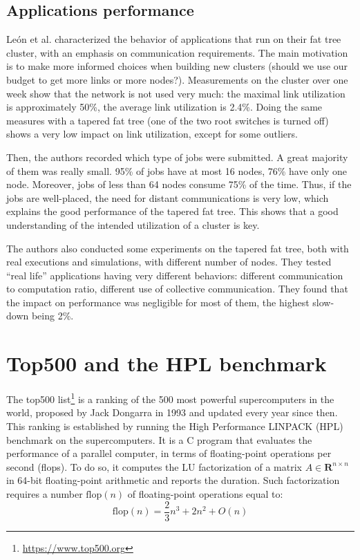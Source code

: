 \documentclass[12pt, a4paper]{memoir}
\begin{document}
\subsection{Applications performance}
\label{sec:orgfb9773e}
León et al.\cite{Leon:2016:CPS:3014904.3015009} characterized the behavior of applications that run on
their fat tree cluster, with an emphasis on communication requirements. The main motivation is to make more informed
choices when building new clusters (should we use our budget to get more links or more nodes?).  Measurements on the
cluster over one week show that the network is not used very much: the maximal link utilization is approximately
50\%, the average link utilization is 2.4\%. Doing the same measures with a tapered fat tree (one of the two root
switches is turned off) shows a very low impact on link utilization, except for some outliers.

Then, the authors recorded which type of jobs were submitted. A great majority of them was really small.  95\% of
jobs have at most 16 nodes, 76\% have only one node. Moreover, jobs of less than 64 nodes consume 75\% of the time.
Thus, if the jobs are well-placed, the need for distant communications is very low, which explains the good
performance of the tapered fat tree. This shows that a good understanding of the intended utilization of a cluster
is key.

The authors also conducted some experiments on the tapered fat tree, both with real executions and simulations, with
different number of nodes. They tested “real life” applications having very different behaviors: different
communication to computation ratio, different use of collective communication. They found that the impact on
performance was negligible for most of them, the highest slow-down being 2\%.

\section{Top500 and the HPL benchmark}
\label{sec:orgb455b0c}
The top500 list\footnote{\url{https://www.top500.org}} is a ranking of the 500 most powerful supercomputers in the world, proposed by Jack
Dongarra in 1993 and updated every year since then.  This ranking is established by running the High Performance
LINPACK (HPL) benchmark\cite{Dongarra03thelinpack} on the supercomputers. It is a C program that evaluates the
performance of a parallel computer, in terms of floating-point operations per second (flops). To do so, it computes
the LU factorization of a matrix \(A \in \mathbf{R}^{n \times n}\) in 64-bit floating-point arithmetic and reports the
duration. Such factorization requires a number \(\mathrm{flop}(n)\) of floating-point operations equal to:
\[\mathrm{flop}(n) = \frac{2}{3}n^3 + 2n^2 + O(n)\]
\end{document}
